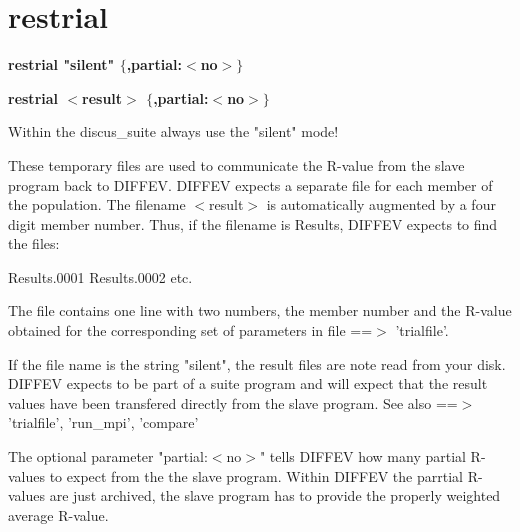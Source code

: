 \section{restrial}
{\bf restrial "silent" $ \{$,partial:$ <$no$> $$\} $ \par }
{\bf restrial $ <$result$> $ $ \{$,partial:$ <$no$> $$\} $ \par }
\par
\vspace{3pt}
Within the discus\_suite always use the "silent" mode! 
\par
These temporary files are used to communicate the R-value from the 
slave program back to DIFFEV. 
DIFFEV expects a separate file for each member of the population. 
The filename $ <$result$> $ is automatically augmented by a four digit 
member number. Thus, if the filename is Results, DIFFEV expects to 
find the files: 
\begin{MacVerbatim}
Results.0001
Results.0002
etc.
\end{MacVerbatim}
The file contains one line with two numbers, the member number and 
the R-value obtained for the corresponding set of parameters in 
file ==$> $ 'trialfile'. 
\par
If the file name is the string "silent", the result files are 
note read from your disk. DIFFEV expects to be part of a suite 
program and will expect that the result values have been transfered 
directly from the slave program. See also ==$> $ 'trialfile', 
'run\_mpi', 'compare' 
\par
The optional parameter "partial:$ <$no$> $" tells DIFFEV how many 
partial R-values to expect from the the slave program. 
Within DIFFEV the parrtial R-values are just archived, the slave 
program has to provide the properly weighted average R-value. 
\par
